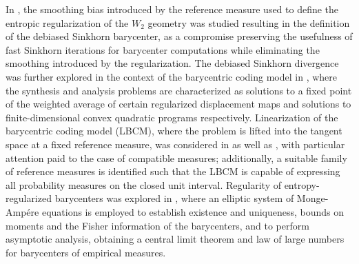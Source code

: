 \documentclass{article}
\begin{document}
In \cite{janatiDebiasedSinkhornBarycenters2020}, the smoothing bias introduced by the reference measure used to define the entropic regularization of the \(W_2\) geometry was studied resulting in the definition of the debiased Sinkhorn barycenter, as a compromise preserving the usefulness of fast Sinkhorn iterations for barycenter computations while eliminating the smoothing introduced by the regularization. The debiased Sinkhorn divergence was further explored in the context of the barycentric coding model in \cite{mallery2025synthesis}, where the synthesis and analysis problems are characterized as solutions to a fixed point of the weighted average of certain regularized displacement maps and solutions to finite-dimensional convex quadratic programs respectively. Linearization of the barycentric coding model (LBCM), where the problem is lifted into the tangent space at a fixed reference measure, was considered in \cite{merigotQuantitativeStabilityOptimal2020} as well as \cite{werenskiLinearizedWassersteinBarycenters2025}, with particular attention paid to the case of compatible measures; additionally, a suitable family of reference measures is identified such that the LBCM is capable of expressing all probability measures on the closed unit interval.   Regularity of entropy-regularized barycenters was explored in \cite{carlierEntropicWassersteinBarycentersPDE2021}, where an elliptic system of Monge-Amp{\'e}re equations is employed to establish existence and uniqueness, bounds on moments and the Fisher information of the barycenters, and to perform asymptotic analysis, obtaining a central limit theorem and law of large numbers for barycenters of empirical measures.
\end{document}
